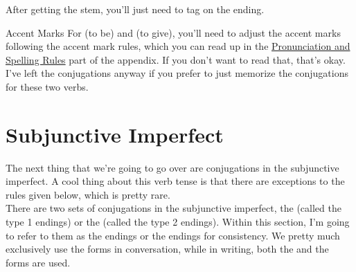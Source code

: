 After getting the stem, you'll just need to tag on the ending. 
\begin{conf}{Accent Marks}
	For  (to be) and  (to give), you'll need to adjust the accent marks following the accent mark rules, which you can read up in the \hyperref[subsec:pronun]{Pronunciation and Spelling Rules} part of the appendix. If you don't want to read that, that's okay. I've left the conjugations anyway if you prefer to just memorize the conjugations for these two verbs.
\end{conf}









\section{Subjunctive Imperfect}

The next thing that we're going to go over are conjugations in the subjunctive imperfect. A cool thing about this verb tense is that there are  exceptions to the rules given below, which is pretty rare. \\

There are two sets of conjugations in the subjunctive imperfect, the  (called the type 1 endings) or the  (called the type 2 endings). Within this section, I'm going to refer to them as the  endings or the  endings for consistency. We pretty much exclusively use the  forms in conversation, while in writing, both the  and the  forms are used.\\

